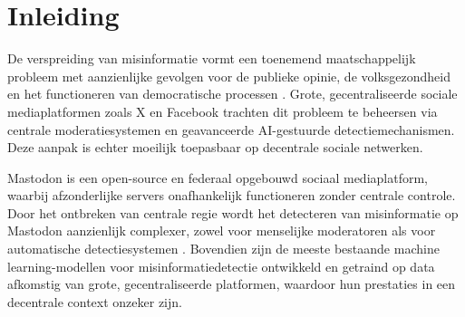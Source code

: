 


% 
\setlength{\emergencystretch}{3em}

\section{Inleiding}%
\label{sec:inleiding}

De verspreiding van misinformatie vormt een toenemend maatschappelijk probleem met aanzienlijke gevolgen
voor de publieke opinie, de volksgezondheid en het functioneren van democratische processen \autocite{Vosoughi2018}.
Grote, gecentraliseerde sociale mediaplatformen zoals X en Facebook trachten dit probleem te beheersen
via centrale moderatiesystemen en geavanceerde AI-gestuurde detectiemechanismen.
Deze aanpak is echter moeilijk toepasbaar op decentrale sociale netwerken.

Mastodon is een open-source en federaal opgebouwd sociaal mediaplatform,
waarbij afzonderlijke servers onafhankelijk functioneren zonder centrale controle.
Door het ontbreken van centrale regie wordt het detecteren van misinformatie op Mastodon
aanzienlijk complexer, zowel voor menselijke moderatoren als voor automatische detectiesystemen \autocite{SpencerSmith2025}.
Bovendien zijn de meeste bestaande machine learning-modellen voor misinformatiedetectie
ontwikkeld en getraind op data afkomstig van grote, gecentraliseerde platformen,
waardoor hun prestaties in een decentrale context onzeker zijn.

